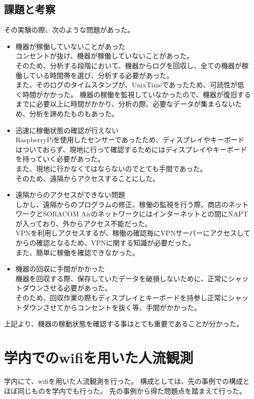 \subsection{課題と考察}
その実験の際、次のような問題があった。
\begin{itemize}
	\item 機器が稼働していないことがあった\\
		コンセントが抜け、機器が稼働していないことがあった。\\
		そのため、分析する段階において、機器からログを回収し、全ての機器が稼働している時間帯を選び、分析する必要があった。\\
		また、そのログのタイムスタンプが、UnixTimeであったため、可読性が低く時間がかかった。
		機器の稼働を監視していなかったので、機器が復旧するまでに必要以上に時間がかかり、分析の際、必要なデータが集まらないため、分析を諦めたものもあった。
	\item 迅速に稼働状態の確認が行えない\\
		RaspberryPiを使用したセンサーであったため、ディスプレイやキーボードはついておらず、現地に行って確認するためにはディスプレイやキーボードを持っていく必要があった。\\
		また、現地に行かなくてはならないのでとても手間であった。\\
		そのため、遠隔からアクセスすることにした。\\
	\item 遠隔からのアクセスができない問題\\
		しかし、遠隔からのプログラムの修正、稼働の監視を行う際、商店のネットワークとSORACOM Airのネットワークにはインターネットとの間にNAPTが入っており、外からアクセス不能だった。\\
		VPNを利用しアクセスするが、稼働の確認毎にVPNサーバーにアクセスしてからの確認となるため、VPNに関する知識が必要だった。\\
		また、簡単に稼働を確認できなかった。
	\item 機器の回収に手間がかかった\\
		機器を回収する際、保存していたデータを破損しないために、正常にシャットダウンさせる必要があった。\\
		そのため、回収作業の際もディスプレイとキーボードを持参し正常にシャットダウンさせてからコンセントを抜く等、手間がかかった。
\end{itemize}
上記より、機器の稼動状態を確認する事はとても重要であることが分かった。

\section{学内でのwifiを用いた人流観測}
学内にて、wifiを用いた人流観測を行った。
構成としては、先の事例での構成とほぼ同じものを学内でも行った。
先の事例から得た問題点を踏まえて行った。

